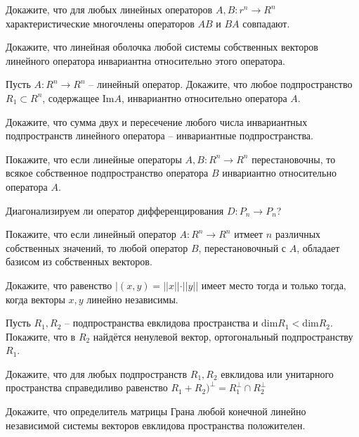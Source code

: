 \begin{list}{.}{}
\item Докажите, что для любых линейных операторов $A,B:r^n \to R^n$ характеристические многочлены операторов $AB$ и $BA$ совпадают.

\item Докажите, что линейная оболочка любой системы собственных векторов линейного оператора инвариантна относительно этого оператора.

\item Пусть $A:R^n \to R^n$ -- линейный оператор. Докажите, что любое подпространство $R_1 \subset R^n$, содержащее $\mathrm{Im}A$, инвариантно относительно оператора $A$.

\item Докажите, что сумма двух и пересечение любого числа инвариантных подпространств линейного оператора -- инвариантные подпространства.

\item Покажите, что если линейные операторы $A,B:R^n \to R^n$ перестановочны, то всякое собственное подпространство оператора $B$ инвариантно относительно оператора $A$.

\item Диагонализируем ли оператор дифференцирования $D:P_n \to P_n$?

\item Покажите, что если линейный оператор $A:R^n \to R^n$ итмеет $n$ различных собственных значений, то любой оператор $B$, перестановочный с $A$, обладает базисом из собственных векторов.

\item Докажите, что равенство $|(x,y)=||x||\cdot||y||$ имеет место тогда и только тогда, когда векторы $x,y$ линейно независимы.

\item Пусть $R_1, R_2$ -- подпространства евклидова пространства и $\mathrm{dim} R_1 < \mathrm{dim} R_2$. Покажите, что в $R_2$ найдётся ненулевой вектор, ортогональный подпространству $R_1$.

\item Докажите, что для любых подпространств  $R_1,R_2$ евклидова или унитарного пространства справедиливо равенство $R_1 + R_2)^\perp =R_1^\perp \cap R_2^\perp$

\item Докажите, что определитель матрицы Грана любой конечной линейно независимой системы векторов евклидова пространства положителен.

\end{list}


